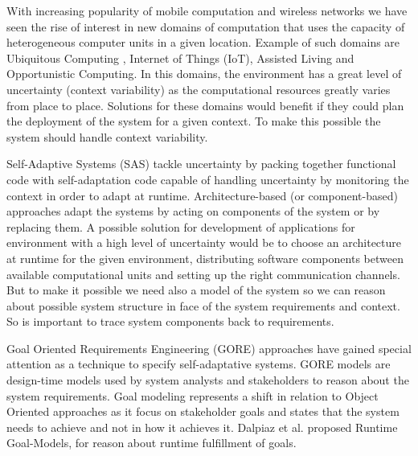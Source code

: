 

With increasing popularity of mobile computation and wireless networks we have seen the rise of  interest in new domains of computation that uses the capacity of heterogeneous computer units in a given location.
Example of such domains are Ubiquitous Computing \cite{bell_yesterdays_2007}, Internet of Things (IoT)\cite{atzori_internet_2010}, Assisted Living\cite{kleinberger_ambient_2007} and Opportunistic Computing\cite{smaldone_improving_2011}. In this domains, the environment has a great level of uncertainty (context variability) as the computational resources greatly varies from place to place.
Solutions for these domains would benefit if they could plan the deployment of the system for a given context. To make this possible the system should handle context variability.


Self-Adaptive Systems (SAS) tackle uncertainty by packing together functional code with self-adaptation code capable of handling uncertainty by monitoring the context in order to adapt at runtime.
Architecture-based (or component-based) approaches adapt the systems by acting on components of the system or by replacing them\cite{garlan_software_2009}. A possible solution for development of applications for environment with a high level of uncertainty would be to choose an architecture at runtime for the given environment, distributing software components between available computational units and setting up the right communication channels. But to make it possible we need also a model of the system so we can reason about possible system structure in face of the system requirements and context.
So is important to trace system components back to requirements.

Goal Oriented Requirements Engineering (GORE) approaches have gained special attention as a technique to specify self-adaptative systems. GORE models are design-time models used by system analysts and stakeholders to reason about the system requirements.  Goal modeling represents a shift in relation to Object Oriented approaches as it focus on stakeholder goals and states that the system needs to achieve and not in how it achieves it\cite{ali_goal-based_2010}. Dalpiaz et al.\cite{dalpiaz_runtime_2013} proposed Runtime Goal-Models, for reason about runtime fulfillment of goals.

